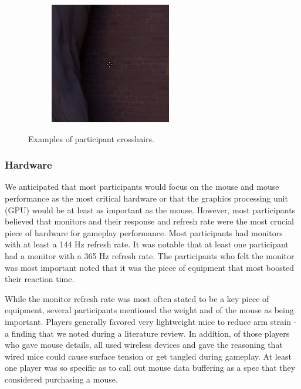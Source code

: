 \documentclass[11pt,manuscript,screen,review]{acmart} %
\begin{document}
\begin{figure}[h]
\begin{subfigure}{0.3\linewidth}
    \end{subfigure}
    \begin{subfigure}{0.3\linewidth}
        \includegraphics[width=\linewidth]{img/tiny.png}
    \end{subfigure}
    \caption{Examples of participant crosshairs.}
    \label{fig:crosshairs}
\end{figure}

\subsubsection{Hardware}

We anticipated that most participants would focus on the mouse and mouse performance as the most critical hardware or that the graphics processing unit (GPU) would be at least as important as the mouse. However, most participants believed that monitors and their response and refresh rate were the most crucial piece of hardware for gameplay performance. Most participants had monitors with at least a 144 Hz refresh rate. It was notable that at least one participant had a monitor with a 365 Hz refresh rate. The participants who felt the monitor was most important noted that it was the piece of equipment that most boosted their reaction time.

While the monitor refresh rate was most often stated to be a key piece of equipment, several participants mentioned the weight and of the mouse as being important. Players generally favored very lightweight mice to reduce arm strain - a finding that we noted during a literature review\cite{Li2019}. In addition, of those players who gave mouse details, all used wireless devices and gave the reasoning that wired mice could cause surface tension or get tangled during gameplay. At least one player was so specific as to call out mouse data buffering as a spec that they considered purchasing a mouse.
\end{document}
